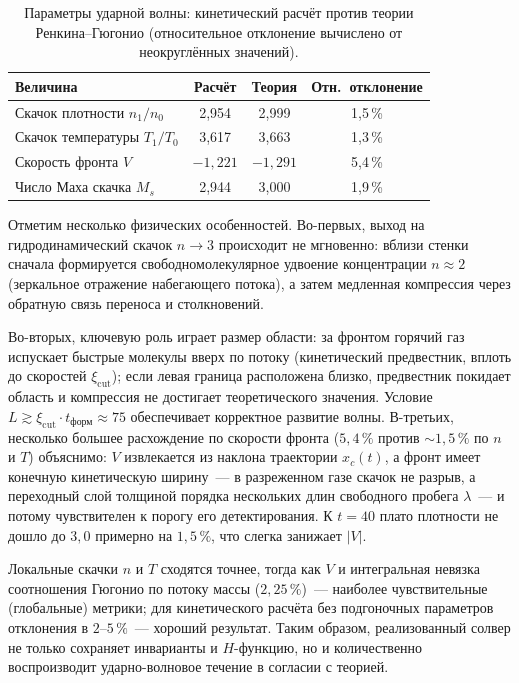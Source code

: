 \begin{table}[htbp]
    \centering
\caption{Параметры ударной волны: кинетический расчёт против теории Ренкина--Гюгонио (относительное отклонение вычислено
от неокруглённых значений).}
    \label{tab:hugoniot}
    \begin{tabular}{lccc}
        \hline
        Величина                     & Расчёт     & Теория     & Отн.~отклонение \\
        \hline
        Скачок плотности $n_1/n_0$   & 2,954      & 2,999      & 1,5\,\%         \\
        Скачок температуры $T_1/T_0$ & 3,617      & 3,663      & 1,3\,\%         \\
        Скорость фронта $V$          & $-1{,}221$ & $-1{,}291$ & 5,4\,\%         \\
        Число Маха скачка $M_s$      & 2,944      & 3,000      & 1,9\,\%         \\
        \hline
    \end{tabular}
\end{table}

Отметим несколько физических особенностей.
Во-первых, выход на гидродинамический скачок $n\to3$ происходит не мгновенно: вблизи стенки сначала формируется
свободномолекулярное удвоение концентрации $n\approx2$ (зеркальное отражение набегающего потока), а затем медленная
компрессия через обратную связь переноса и столкновений.

Во-вторых, ключевую роль играет размер области: за фронтом горячий газ испускает быстрые молекулы вверх по потоку
(кинетический предвестник, вплоть до скоростей $\xi_{\mathrm{cut}}$); если левая граница расположена близко, предвестник
покидает область и компрессия не достигает теоретического значения.
Условие $L\gtrsim\xi_{\mathrm{cut}}\cdot t_{\text{форм}}\approx75$ обеспечивает корректное развитие волны.
В-третьих, несколько большее расхождение по скорости фронта ($5{,}4\,\%$ против $\sim1{,}5\,\%$ по $n$ и $T$) объяснимо:
$V$ извлекается из наклона траектории $x_c(t)$, а фронт имеет конечную кинетическую ширину~--- в разреженном газе скачок
не разрыв, а переходный слой толщиной порядка нескольких длин свободного пробега $\lambda$~--- и потому чувствителен к
порогу его детектирования.
К $t=40$ плато плотности не дошло до $3{,}0$ примерно на $1{,}5\,\%$, что слегка занижает $|V|$.

Локальные скачки $n$ и $T$ сходятся точнее, тогда как $V$ и интегральная невязка соотношения Гюгонио по потоку массы
($2{,}25\,\%$)~--- наиболее чувствительные (глобальные) метрики; для кинетического расчёта без подгоночных параметров
отклонения в $2$--$5\,\%$~--- хороший результат.
Таким образом, реализованный солвер не только сохраняет инварианты и $H$-функцию, но и количественно воспроизводит
ударно-волновое течение в согласии с теорией.

